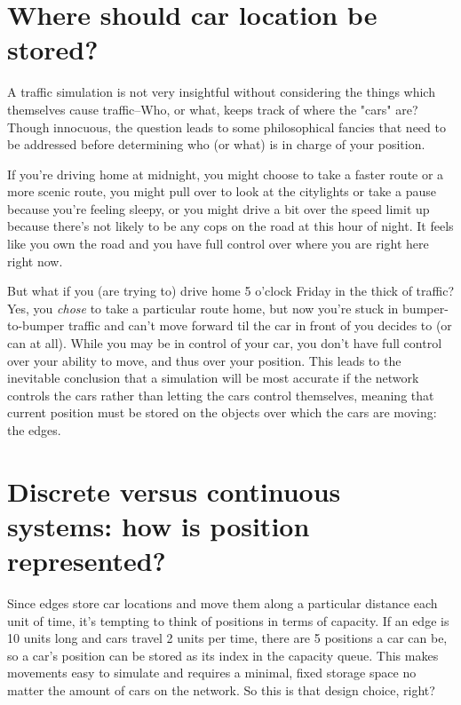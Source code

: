 \section{Where should car location be stored?}

\par A traffic simulation is not very insightful without considering the things which themselves cause traffic--Who, or what, keeps track of where the "cars" are?  Though innocuous, the question leads to some philosophical fancies that need to be addressed before determining who (or what) is in charge of your position. \\

\par If you're driving home at midnight, you might choose to take a faster route or a more scenic route, you might pull over to look at the citylights or take a pause because you're feeling sleepy, or you might drive a bit over the speed limit up because there's not likely to be any cops on the road at this hour of night.  It feels like you own the road and you have full control over where you are right here right now.  \\

\par But what if you (are trying to) drive home 5 o'clock Friday in the thick of traffic?  Yes, you \textit{chose} to take a particular route home, but now you're stuck in bumper-to-bumper traffic and can't move forward til the car in front of you decides to (or can at all).  While you may be in control of your car, you don't have full control over your ability to move, and thus over your position.  This leads to the inevitable conclusion that a simulation will be most accurate if the network controls the cars rather than letting the cars control themselves, meaning that current position must be stored on the objects over which the cars are moving:  the edges.


\section{Discrete versus continuous systems:  how is position represented?}

\par Since edges store car locations and move them along a particular distance each unit of time, it's tempting to think of positions in terms of capacity.  If an edge is 10 units long and cars travel 2 units per time, there are 5 positions a car can be, so a car's position can be stored as its index in the capacity queue.  This makes movements easy to simulate and requires a minimal, fixed storage space no matter the amount of cars on the network.  So this is that design choice, right? \\

